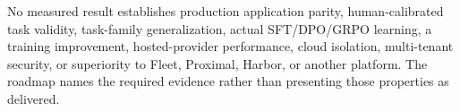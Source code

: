 \documentclass[
  11pt,
  letterpaper,
]{article}
\begin{document}
No measured result establishes production application parity,
human-calibrated task validity, task-family generalization, actual
SFT/DPO/GRPO learning, a training improvement, hosted-provider
performance, cloud isolation, multi-tenant security, or superiority to
Fleet, Proximal, Harbor, or another platform. The roadmap names the
required evidence rather than presenting those properties as delivered.
\end{document}

